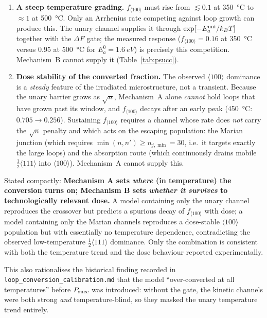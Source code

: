 \documentclass[11pt,a4paper]{article}
\newcommand{\fhkl}{f_{\langle100\rangle}}
\newcommand{\bv}{\tfrac12\langle111\rangle}
\begin{document}
\begin{enumerate}
\item \textbf{A steep temperature grading.} $\fhkl$ must rise from
  $\lesssim0.1$ at \SI{350}{\celsius} to $\approx1$ at \SI{500}{\celsius}. Only
  an Arrhenius rate competing against loop growth can produce this. The unary
  channel supplies it through $\exp[-E_a^{\rm uni}/k_BT]$ together with the
  $\Delta F$ gate; the measured response
  ($\fhkl=0.16$ at \SI{350}{\celsius} versus $0.95$ at \SI{500}{\celsius} for
  $E_a^0=\SI{1.6}{eV}$) is precisely this competition. Mechanism~B cannot supply
  it (Table~\ref{tab:psucc}).

\item \textbf{Dose stability of the converted fraction.} The observed
  $\langle100\rangle$ dominance is a \emph{steady} feature of the irradiated
  microstructure, not a transient. Because the unary barrier grows as
  $\sqrt{n}$, Mechanism~A alone \emph{cannot} hold loops that have grown past its
  window, and $\fhkl$ decays after an early peak
  (\SI{450}{\celsius}: $0.705\to0.256$). Sustaining $\fhkl$ requires a channel
  whose rate does \emph{not} carry the $\sqrt{n}$ penalty and which acts on the
  escaping population: the Marian junction (which requires
  $\min(n,n')\ge n_{j,\min}=30$, i.e.\ it targets exactly the large loops) and
  the absorption route (which continuously drains mobile $\bv$ into
  $\langle100\rangle$). Mechanism~A cannot supply this.
\end{enumerate}

\noindent
Stated compactly: \textbf{Mechanism A sets \emph{where} (in temperature) the
conversion turns on; Mechanism B sets \emph{whether it survives} to
technologically relevant dose.} A model containing only the unary channel
reproduces the crossover but predicts a spurious decay of $\fhkl$ with dose;
a model containing only the Marian channels reproduces a dose-stable
$\langle100\rangle$ population but with essentially no temperature dependence,
contradicting the observed low-temperature $\bv$ dominance. Only the
combination is consistent with both the temperature trend and the dose
behaviour reported experimentally.

This also rationalises the historical finding recorded in
\texttt{loop\_conversion\_calibration.md} that the model ``over-converted at all
temperatures'' before $P_{\rm succ}$ was introduced: without the gate, the
kinetic channels were both strong \emph{and} temperature-blind, so they masked
the unary temperature trend entirely.
\end{document}
